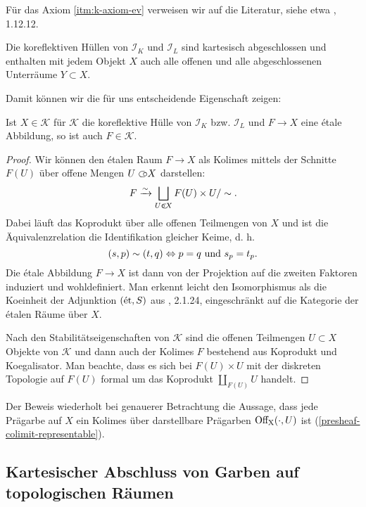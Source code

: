 Für das Axiom \ref{itm:k-axiom-ev} verweisen wir auf die Literatur,
siehe etwa \cite{TM}, 1.12.12.

\begin{kor}
  Die koreflektiven Hüllen von $\mathcal{I}_K$ und $\mathcal{I}_L$
  sind kartesisch abgeschlossen und enthalten mit jedem Objekt $X$
  auch alle offenen und alle abgeschlossenen Unterräume $Y \subset X$.
\end{kor}

Damit können wir die für uns entscheidende Eigenschaft zeigen:
\begin{prop} \label{k-etale-closed}
  Ist $X \in \mathcal{K}$ für $\mathcal{K}$ die koreflektive Hülle von
  $\mathcal{I}_K$ bzw. $\mathcal{I}_L$ und $F \to X$ eine étale
  Abbildung, so ist auch $F \in \mathcal{K}$.
\end{prop}
\begin{proof}
  Wir können den étalen Raum $F \to X$ als Kolimes mittels der
  Schnitte $F(U)$ über offene Mengen $U \subset\kern-0.58em\circ X$ darstellen:
  \[ F \xrightarrow[]{\sim} \bigsqcup_{U \subset\kern-0.58em\circ X} F(U) \times U / \sim. \]
  Dabei läuft das Koprodukt über alle offenen Teilmengen von $X$ und
  ist die Äquivalenzrelation die Identifikation gleicher Keime, d. h.
  \[ (s, p) \sim (t, q) \Leftrightarrow p = q \text{ und } s_p = t_p. \]
  Die étale Abbildung $F \to X$ ist dann von der Projektion auf die
  zweiten Faktoren induziert und wohldefiniert. Man erkennt leicht den
  Isomorphismus als die Koeinheit der Adjunktion $(\mathrm{\acute{e}t}, S)$ aus
  \cite{TG}, 2.1.24, eingeschränkt auf die Kategorie der étalen Räume
  über $X$.

  Nach den Stabilitätseigenschaften von $\mathcal{K}$ sind die offenen
  Teilmengen $U \subset X$ Objekte von $\mathcal{K}$ und dann auch der
  Kolimes $F$ bestehend aus Koprodukt und Koegalisator. Man beachte,
  dass es sich bei $F(U) \times U$ mit der diskreten Topologie auf
  $F(U)$ formal um das Koprodukt $\coprod_{F(U)} U$ handelt.
\end{proof}
\begin{bem}
  Der Beweis wiederholt bei genauerer Betrachtung die Aussage, dass
  jede Prägarbe auf $X$ ein Kolimes über darstellbare Prägarben
  $\operatorname{Off_X}(\cdot, U)$ ist (\ref{presheaf-colimit-representable}).
\end{bem}

\subsection{Kartesischer Abschluss von Garben auf topologischen Räumen} 
\label{sec:enstop-cart-closed}


